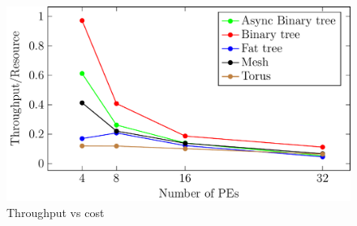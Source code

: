 \begin{figure}[t]
\centering
   \includegraphics[width=\columnwidth]{Data/tputVsCost.pdf}
   \caption{Throughput vs cost}
      \label{fig:tputPerf}
\end{figure}
